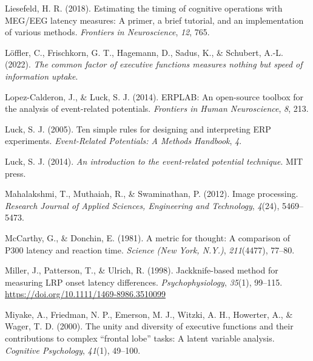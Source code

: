 \documentclass[
  man]{apa7}
\newlength{\cslhangindent}
\newlength{\cslentryspacingunit} %
\newenvironment{CSLReferences}[2] %
 {%
  \setlength{\parindent}{0pt}
  \ifodd #1
  \let\oldpar\par
  \def\par{\hangindent=\cslhangindent\oldpar}
  \fi
  \setlength{\parskip}{#2\cslentryspacingunit}
 }%
 {}
\begin{document}
\begin{CSLReferences}{1}{0}
\leavevmode{}%
Liesefeld, H. R. (2018). Estimating the timing of cognitive operations with {MEG}/{EEG} latency measures: A primer, a brief tutorial, and an implementation of various methods. \emph{Frontiers in Neuroscience}, \emph{12}, 765.

\leavevmode{}%
Löffler, C., Frischkorn, G. T., Hagemann, D., Sadus, K., \& Schubert, A.-L. (2022). \emph{The common factor of executive functions measures nothing but speed of information uptake}.

\leavevmode{}%
Lopez-Calderon, J., \& Luck, S. J. (2014). {ERPLAB}: An open-source toolbox for the analysis of event-related potentials. \emph{Frontiers in Human Neuroscience}, \emph{8}, 213.

\leavevmode{}%
Luck, S. J. (2005). Ten simple rules for designing and interpreting {ERP} experiments. \emph{Event-Related Potentials: A Methods Handbook}, \emph{4}.

\leavevmode{}%
Luck, S. J. (2014). \emph{An introduction to the event-related potential technique}. MIT press.

\leavevmode{}%
Mahalakshmi, T., Muthaiah, R., \& Swaminathan, P. (2012). Image processing. \emph{Research Journal of Applied Sciences, Engineering and Technology}, \emph{4}(24), 5469--5473.

\leavevmode{}%
McCarthy, G., \& Donchin, E. (1981). A metric for thought: A comparison of {P300} latency and reaction time. \emph{Science (New York, N.Y.)}, \emph{211}(4477), 77--80.

\leavevmode{}%
Miller, J., Patterson, T., \& Ulrich, R. (1998). Jackknife-based method for measuring {LRP} onset latency differences. \emph{Psychophysiology}, \emph{35}(1), 99--115. \url{https://doi.org/10.1111/1469-8986.3510099}

\leavevmode{}%
Miyake, A., Friedman, N. P., Emerson, M. J., Witzki, A. H., Howerter, A., \& Wager, T. D. (2000). The unity and diversity of executive functions and their contributions to complex {``frontal lobe''} tasks: {A} latent variable analysis. \emph{Cognitive Psychology}, \emph{41}(1), 49--100.


\end{CSLReferences}
\end{document}
